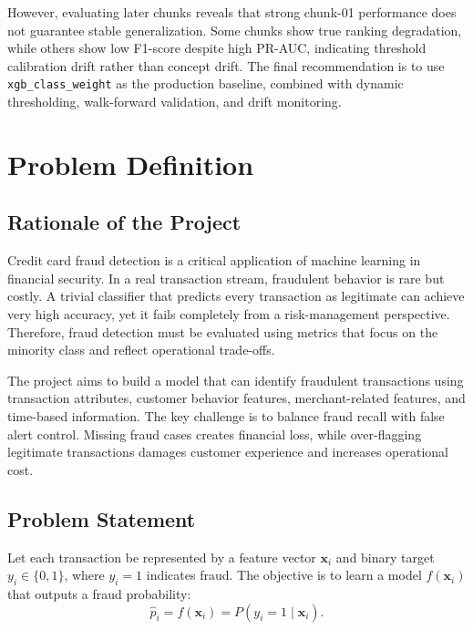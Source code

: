 \documentclass[12pt,a4paper]{article}
\begin{document}
However, evaluating later chunks reveals that strong chunk-01 performance does not guarantee stable generalization. Some chunks show true ranking degradation, while others show low F1-score despite high PR-AUC, indicating threshold calibration drift rather than concept drift. The final recommendation is to use \texttt{xgb\_class\_weight} as the production baseline, combined with dynamic thresholding, walk-forward validation, and drift monitoring.

\newpage
{}

\section{Problem Definition}

\subsection{Rationale of the Project}

Credit card fraud detection is a critical application of machine learning in financial security. In a real transaction stream, fraudulent behavior is rare but costly. A trivial classifier that predicts every transaction as legitimate can achieve very high accuracy, yet it fails completely from a risk-management perspective. Therefore, fraud detection must be evaluated using metrics that focus on the minority class and reflect operational trade-offs.

The project aims to build a model that can identify fraudulent transactions using transaction attributes, customer behavior features, merchant-related features, and time-based information. The key challenge is to balance fraud recall with false alert control. Missing fraud cases creates financial loss, while over-flagging legitimate transactions damages customer experience and increases operational cost.

\subsection{Problem Statement}

Let each transaction be represented by a feature vector $\mathbf{x}_i$ and binary target $y_i \in \{0,1\}$, where $y_i=1$ indicates fraud. The objective is to learn a model $f(\mathbf{x}_i)$ that outputs a fraud probability:
\begin{equation}
    \hat{p}_i = f(\mathbf{x}_i) = P(y_i = 1 \mid \mathbf{x}_i).
\end{equation}
\end{document}
